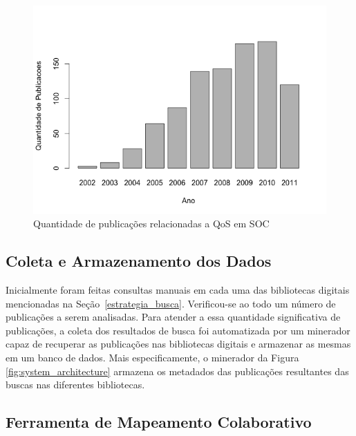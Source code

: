 \begin{figure}[htb]
\centering
\includegraphics[scale=0.42]{imagens/barplotAnoQuantidadePublicacoes.pdf}
\caption{Quantidade de publica\c c\~{o}es relacionadas a QoS em SOC}
\label{fig:barplotAnoPublicacoes}
\end{figure}

\subsection{Coleta e Armazenamento dos Dados}

Inicialmente foram feitas consultas manuais em cada uma das bibliotecas digitais mencionadas na Se\c c\~{a}o~\ref{estrategia_busca}. Verificou-se ao todo um número de \AllPubs publicações a serem analisadas. Para atender a essa quantidade significativa de publica\c c\~{o}es, a coleta dos resultados de busca foi automatizada por um minerador capaz de recuperar as publica\c c\~{o}es nas bibliotecas digitais e armazenar as mesmas em um banco de dados. Mais especificamente, o minerador da Figura \ref{fig:system_architecture} armazena os metadados das publicações resultantes das buscas nas diferentes bibliotecas. 


\subsection{Ferramenta de Mapeamento Colaborativo}

